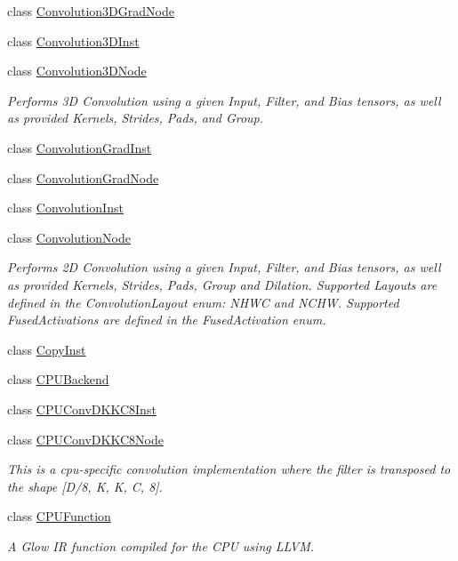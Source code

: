 \begin{DoxyCompactItemize}
\item 
class \hyperlink{classglow_1_1_convolution3_d_grad_node}{Convolution3\+D\+Grad\+Node}
\item 
class \hyperlink{classglow_1_1_convolution3_d_inst}{Convolution3\+D\+Inst}
\item 
class \hyperlink{classglow_1_1_convolution3_d_node}{Convolution3\+D\+Node}
\begin{DoxyCompactList}\small\item\em Performs 3D Convolution using a given Input, Filter, and Bias tensors, as well as provided Kernels, Strides, Pads, and Group. \end{DoxyCompactList}\item 
class \hyperlink{classglow_1_1_convolution_grad_inst}{Convolution\+Grad\+Inst}
\item 
class \hyperlink{classglow_1_1_convolution_grad_node}{Convolution\+Grad\+Node}
\item 
class \hyperlink{classglow_1_1_convolution_inst}{Convolution\+Inst}
\item 
class \hyperlink{classglow_1_1_convolution_node}{Convolution\+Node}
\begin{DoxyCompactList}\small\item\em Performs 2D Convolution using a given Input, Filter, and Bias tensors, as well as provided Kernels, Strides, Pads, Group and Dilation. Supported Layouts are defined in the Convolution\+Layout enum\+: N\+H\+WC and N\+C\+HW. Supported Fused\+Activations are defined in the Fused\+Activation enum. \end{DoxyCompactList}\item 
class \hyperlink{classglow_1_1_copy_inst}{Copy\+Inst}
\item 
class \hyperlink{classglow_1_1_c_p_u_backend}{C\+P\+U\+Backend}
\item 
class \hyperlink{classglow_1_1_c_p_u_conv_d_k_k_c8_inst}{C\+P\+U\+Conv\+D\+K\+K\+C8\+Inst}
\item 
class \hyperlink{classglow_1_1_c_p_u_conv_d_k_k_c8_node}{C\+P\+U\+Conv\+D\+K\+K\+C8\+Node}
\begin{DoxyCompactList}\small\item\em This is a cpu-\/specific convolution implementation where the filter is transposed to the shape \mbox{[}D/8, K, K, C, 8\mbox{]}. \end{DoxyCompactList}\item 
class \hyperlink{classglow_1_1_c_p_u_function}{C\+P\+U\+Function}
\begin{DoxyCompactList}\small\item\em A Glow IR function compiled for the C\+PU using L\+L\+VM. \end{DoxyCompactList}\item 

\end{DoxyCompactItemize}
